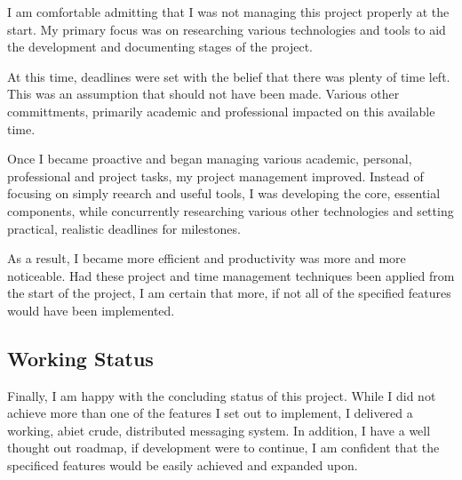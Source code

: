 I am comfortable admitting that I was not managing this project properly
at the start. My primary focus was on researching various technologies
and tools to aid the development and documenting stages of the project.


At this time, deadlines were set with the belief that there was plenty
of time left. This was an assumption that should not have been made.
Various other committments, primarily academic and professional impacted
on this available time.


Once I became proactive and began managing various academic, personal,
professional and project tasks, my project management improved. Instead
of focusing on simply reearch and useful tools, I was developing the
core, essential components, while concurrently researching various other
technologies and setting practical, realistic deadlines for milestones.


As a result, I became more efficient and productivity was more and more
noticeable. Had these project and time management techniques been
applied from the start of the project, I am certain that more, if not
all of the specified features would have been implemented.

\subsection{Working Status}

Finally, I am happy with the concluding status of this project. While I
did not achieve more than one of the features I set out to implement, I
delivered a working, abiet crude, distributed messaging system. In
addition, I have a well thought out roadmap, if development were to
continue, I am confident that the specificed features would be easily 
achieved and expanded upon. 

